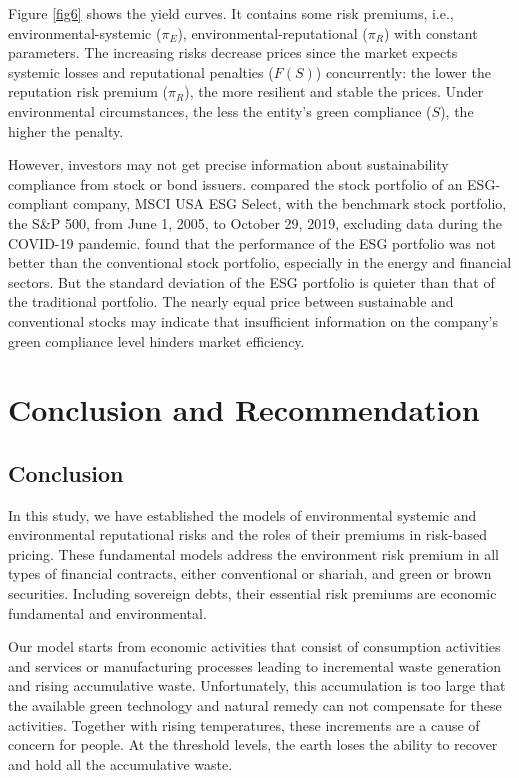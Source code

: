 \documentclass[sn-basic]{sn-jnl}%
\theoremstyle{thmstyleone}%
\theoremstyle{thmstyletwo}%
\theoremstyle{thmstylethree}%
\begin{document}
Figure \ref{fig6} shows the yield curves. It contains some risk premiums, i.e., environmental-systemic ($\pi_{E}$), environmental-reputational ($\pi_{R}$) with constant parameters. The increasing risks decrease prices since the market expects systemic losses and reputational penalties ($F\left(S\right)$) concurrently: the lower the reputation risk premium ($\pi_{R}$), the more resilient and stable the prices. Under environmental circumstances, the less the entity’s green compliance ($S$), the higher the penalty.

However, investors may not get precise information about sustainability compliance from stock or bond issuers. \cite{ouchen2022esg} compared the stock portfolio of an ESG-compliant company, MSCI USA ESG Select, with the benchmark stock portfolio, the S\&P 500, from June 1, 2005, to October 29, 2019, excluding data during the COVID-19 pandemic. \citeauthor{ouchen2022esg} found that the performance of the ESG portfolio was not better than the conventional stock portfolio, especially in the energy and financial sectors. But the standard deviation of the ESG portfolio is quieter than that of the traditional portfolio. The nearly equal price between sustainable and conventional stocks may indicate that insufficient information on the company's green compliance level hinders market efficiency.

\section{Conclusion and Recommendation}
\subsection{Conclusion}
In this study, we have established the models of environmental systemic and environmental reputational risks and the roles of their premiums in risk-based pricing. These fundamental models address the environment risk premium in all types of financial contracts, either conventional or shariah, and green or brown securities. Including sovereign debts, their essential risk premiums are economic fundamental and environmental.

Our model starts from economic activities that consist of consumption activities and services or manufacturing processes leading to incremental waste generation and rising accumulative waste. Unfortunately, this accumulation is too large that the available green technology and natural remedy can not compensate for these activities. Together with rising temperatures, these increments are a cause of concern for people. At the threshold levels, the earth loses the ability to recover and hold all the accumulative waste.
\end{document}
